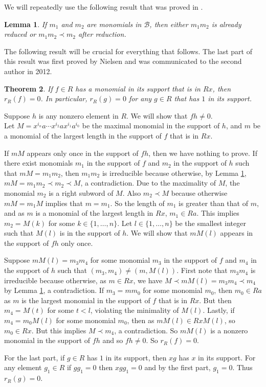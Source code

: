 \documentclass[12pt]{article}
\makeatletter
\theoremstyle{plain}
\newtheorem{thm}{Theorem}[section]
\newtheorem{lemma}[thm]{Lemma}
\theoremstyle{definition}
\renewenvironment{proof}[1][\proofname]{%
	\par\pushQED{\qed}%
	\normalfont %
	\topsep6\p@\@plus6\p@\relax
	\trivlist
	\item[\hskip\labelsep\bfseries #1\@addpunct{.}]%
}{%
	\popQED\endtrivlist\@endpefalse
}
\renewcommand{\proofname}{Proof}
\makeatother
\begin{document}
	\vspace{3mm} We will repeatedly use the following result that was proved in \cite[Lemma 2.2]{Dit}.
	\begin{lemma}\label{D.mainlemma}
		If $m_1$ and $m_2$ are monomials in $\mathcal{B}$, then either $m_1m_2$ is already reduced or $m_1m_2 \prec m_2$ after reduction. 
	\end{lemma} 
	The following result will be crucial for everything that follows. The last part of this result was first proved by Nielsen and was communicated to the second author in 2012.
	\begin{thm}\label{D.mainthm}
		If $f \in R$ has a monomial in its support that is in $Rx$, then $r_R(f) = 0$. In particular,  $r_R(g) = 0$ for any $g \in R$ that has $1$ in its support.
	\end{thm}
	\begin{proof}
		Suppose $h$ is any nonzero element in $R$. We will show that $fh \neq 0$.\\
		Let $M = x^{i_{n}}a\cdots x^{i_{2}}ax^{i_1}a^{i_0}$ be the maximal monomial in the support of $h$, and $m$ be a monomial of the largest length in the support of $f$ that is in $Rx$. 
		
		If $mM$ appears only once in the support of $fh$, then we have nothing to prove. If there exist monomials $m_1$ in the support of $f$ and $m_2$ in the support of $h$ such that $mM = m_1 m_2$, then $m_1m_2$ is irreducible because otherwise, by Lemma \ref{D.mainlemma}, $mM = m_1m_2 \prec m_2 \prec M$, a contradiction. Due to the maximality of $M$, the monomial $m_2$ is a right subword of $M$. Also $m_2 \prec M$ because otherwise $mM = m_1M$ implies that $m = m_1$. So the length of $m_1$ is greater than that of $m$, and as $m$ is a monomial of the largest length in $Rx$,  $m_1 \in  Ra$. This implies $m_2 = M(k)$ for some $k \in \{1, \ldots, n\}$. Let $l \in \{1,\ldots, n\}$ be the smallest integer such that $M(l)$ is in the support of $h$. We will show that $mM(l)$ appears in the support of $fh$ only once.
		
		Suppose $mM(l) = m_3m_4$ for some monomial $m_3$ in the support of $f$ and $m_4$ in the support of $h$ such that $(m_3, m_4) \neq (m, M(l))$. First note that $m_3m_4$ is irreducible because otherwise, as $m \in Rx$, we have $M \prec mM(l) = m_3m_4  \prec  m_4$ by Lemma \ref{D.mainlemma}, a contradiction. If $m_3 = mm_0$ for some monomial $m_0$, then $m_0  \in Ra$ as $m$ is the largest monomial in the support of $f$ that is in $Rx$. But then $m_4 = M(t)$ for some $t < l$, violating the minimality of $M(l)$. Lastly, if $m_4 = m_0M(l)$ for some monomial $m_0$, then as $mM(l) \in RxM(l)$, so $m_0 \in Rx$. But this implies  $M \prec m_4$,  a contradiction.  
		So $mM(l)$ is a nonzero monomial in the support of $fh$ and so $fh \neq 0$. So $r_{ R}(f)=0$.
		
		For the last part, if $g \in R$ has $1$ in its support, then $xg$ has $x$ in its support. For any element $g_1 \in R$ if $gg_1 = 0$ then $xgg_1 = 0$ and by the first part, $g_1 = 0$. Thus $r_R(g) = 0$. 
	\end{proof} 
\end{document}

